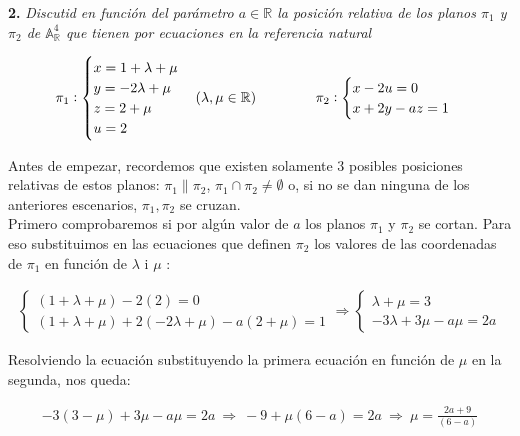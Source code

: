 \textbf{2. } \textit{Discutid en función del parámetro $a\in \mathbb{R}$ la posición relativa de los planos $\pi_1$ y $\pi_2$ de $\mathbb{A}^{4}_\mathbb{R}$ que tienen por ecuaciones en la referencia natural}

\begin{gather*}
    \pi_1 : 
    \begin{cases}
    x = 1 + \lambda + \mu \\
    y = -2\lambda + \mu \\
    z = 2 + \mu \\
    u = 2
    \end{cases}
    (\lambda, \mu \in \mathbb{R}) \hspace{15mm}
    \pi_2 : 
    \begin{cases}
    x -2u = 0 \\
    x + 2y -az = 1
    \end{cases}
\end{gather*}

Antes de empezar, recordemos que existen solamente 3 posibles posiciones relativas de estos planos: $\pi_1 \parallel \pi_2$, $\pi_1 \cap \pi_2 \neq \emptyset$ o, si no se dan ninguna de los anteriores escenarios, $\pi_1, \pi_2$ se cruzan.
\\

Primero comprobaremos si por algún valor de $a$ los planos $\pi_1$ y $\pi_2$ se cortan. Para eso substituimos en las ecuaciones que definen $\pi_2$ los valores de las coordenadas de $\pi_1$ en función de $\lambda$ i $\mu$ :

\begin{gather*}
    \begin{cases}
    (1 + \lambda + \mu) -2(2) = 0 \\
    (1 + \lambda + \mu) + 2(-2\lambda + \mu) -a(2 + \mu) = 1
    \end{cases}
    \Longrightarrow
    \begin{cases}
    \lambda + \mu = 3 \\
    -3\lambda +3\mu -a\mu = 2a
    \end{cases}
\end{gather*}

Resolviendo la ecuación substituyendo la primera ecuación en función de $\mu$ en la segunda, nos queda:

\begin{gather*}
    -3(3 - \mu) + 3\mu - a\mu = 2a\ \Longrightarrow \ -9 + \mu(6 - a) = 2a\ \Longrightarrow\ \mu = \frac{2a + 9}{(6 - a)}
\end{gather*}

